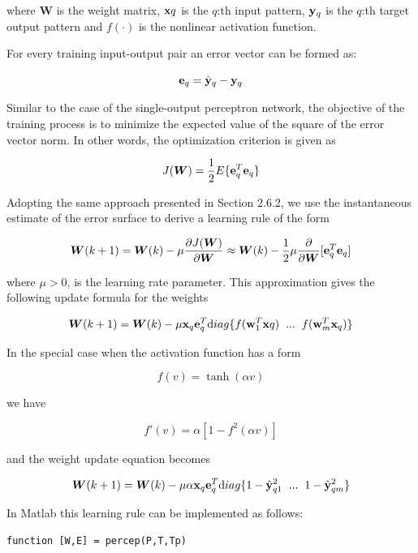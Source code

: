 \documentclass[10pt]{article}
\newcommand{\vect}[1]{{\bf{#1}}}
\newcommand{\matr}[1]{\boldsymbol{#1}}
\begin{document}
\begin{enumerate}
where $\matr{W}$ is the weight matrix, $\vect{x}q$ is the $q$:th input pattern, $\vect{y}_q$ is
the $q$:th target output pattern and $f(\cdot)$ is the nonlinear activation
function.

For every training input-output pair an error vector can be formed as:

\[
\vect{e}_q = \hat{\vect{y}}_q - \vect{y}_q
\]

Similar to the case of the single-output perceptron network, the
objective of the training process is to minimize the expected value of
the square of the error vector norm. In other words, the optimization
criterion is given as

\[
J(\matr{W}) = \frac{1}{2}E \lbrace \vect{e}_q^T\vect{e}_q \rbrace
\]

Adopting the same approach presented in Section 2.6.2, we use the instantaneous estimate of the error
surface to derive a learning rule of the form

\[
\matr{W}(k+1) = \matr{W}(k) - \mu \frac{\partial J(\matr{W})}{\partial \matr{W}} \approx 
\matr{W}(k) -
\frac{1}{2} \mu
\frac{\partial}{\partial \matr{W}} [\vect{e}_q^T\vect{e}_q]
\]

where $\mu>0$, is the learning rate parameter. This approximation
gives the following update formula for the weights

\[
\matr{W}(k+1) = \matr{W}(k) - \mu \vect{x}_q \vect{e}_q^T {\text
  diag}
\lbrace f(\vect{w}_1^T\vect{x}q) \hspace{2mm}...\hspace{2mm} f(\vect{w}_m^T\vect{x}_q) \rbrace
\]

In the special case when the activation function has a form

\[
f(v) = \tanh(\alpha v)
\]

we have

\[
f'(v) = \alpha [1 - f^2(\alpha v)]
\]

and the weight update equation becomes

\[
\matr{W}(k+1) = \matr{W}(k) - \mu \alpha \vect{x}_q \vect{e}_q^T {\text diag} \lbrace 1-\hat{\vect{y}}_{q1}^2
 \hspace{2mm}...\hspace{2mm} 1-\hat{\vect{y}}_{qm}^2 \rbrace
\]

In Matlab this learning rule can be implemented as follows:

\begin{small}
\begin{verbatim}
function [W,E] = percep(P,T,Tp)


\end{verbatim}
\end{small}
\end{enumerate}
\end{document}
